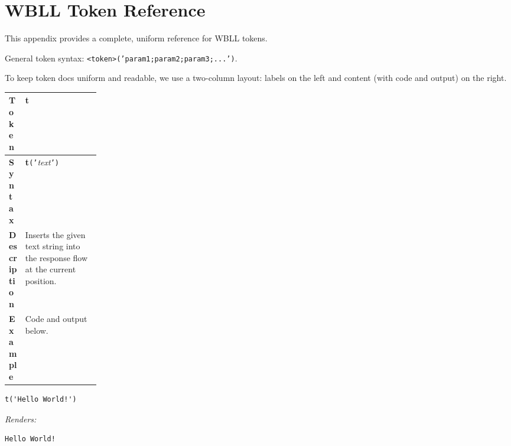 
\chapter{WBLL Token Reference}
\label{app:wbll-tokens}

This appendix provides a complete, uniform reference for WBLL tokens.

General token syntax: \texttt{<token>('param1;param2;param3;...')}.

To keep token docs uniform and readable, we use a two-column layout: labels on the left and content (with code and output) on the right.

\begin{tcolorbox}[colback=white!0,colframe=black!15,boxrule=0.5pt,arc=2pt]
{\small{}%
\begin{tabularx}{\linewidth}{@{}p{0.18\linewidth} X@{}}
\textbf{Token} & \textbf{t} \\
\hline
\textbf{Syntax} & \textbf{t}\texttt{('}\textit{text}\texttt{')} \\
\hline
\textbf{Description} & Inserts the given text string into the response flow at the current position. \\
\hline
\textbf{Example} & Code and output below. \\
\end{tabularx}}

\vspace{0.3em}
\lstset{language=JavaScript}
\begin{lstlisting}
t('Hello World!')
\end{lstlisting}
\textit{Renders:}
\lstset{language=}
\begin{lstlisting}
Hello World!
\end{lstlisting}
\end{tcolorbox}

